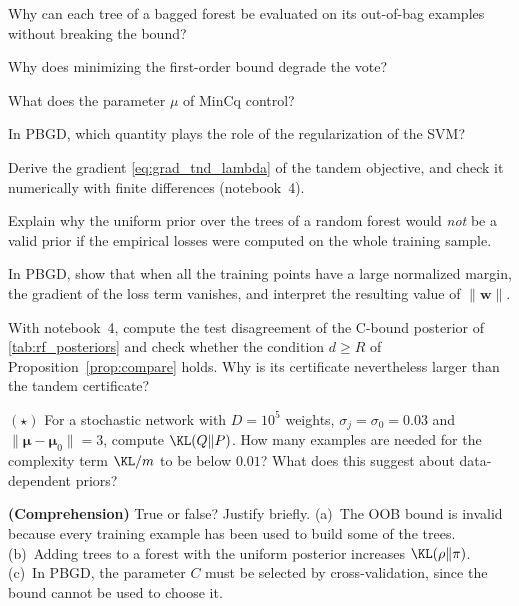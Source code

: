 \begin{quickchecks}
\item Why can each tree of a bagged forest be evaluated on its out-of-bag examples without breaking the bound?
\item Why does minimizing the first-order bound degrade the vote?
\item What does the parameter $\mu$ of MinCq control?
\item In PBGD, which quantity plays the role of the regularization of the SVM?
\end{quickchecks}

\begin{exercises}
\begin{exercise}
Derive the gradient \eqref{eq:grad_tnd_lambda} of the tandem objective, and check
it numerically with finite differences (notebook~4).
\end{exercise}
\begin{exercise}
Explain why the uniform prior over the trees of a random forest would \emph{not} be
a valid prior if the empirical losses were computed on the whole training sample.
\end{exercise}
\begin{exercise}
In PBGD, show that when all the training points have a large normalized margin,
the gradient of the loss term vanishes, and interpret the resulting value of $\|\mathbf w\|$.
\end{exercise}
\begin{exercise}
With notebook~4, compute the test disagreement of the C-bound posterior of
\cref{tab:rf_posteriors} and check whether the condition $d\geq R$ of
Proposition~\ref{prop:compare} holds. Why is its certificate nevertheless
larger than the tandem certificate?
\end{exercise}
\begin{exercise}
$(\star)$ For a stochastic network with $D=10^5$ weights, $\sigma_j=\sigma_0=0.03$ and
$\|\boldsymbol\mu-\boldsymbol\mu_0\|=3$, compute $\KL(Q\|P)$. How many examples are needed for the
complexity term $\KL/m$ to be below $0.01$? What does this suggest about data-dependent priors?
\end{exercise}
\begin{exercise}
\textbf{(Comprehension)} True or false? Justify briefly. (a)~The OOB bound is invalid because
every training example has been used to build some of the trees. (b)~Adding trees to a
forest with the uniform posterior increases $\KL(\rho\|\pi)$. (c)~In PBGD, the parameter $C$
must be selected by cross-validation, since the bound cannot be used to choose it.

\end{exercise}
\end{exercises}
